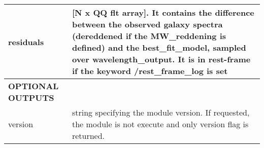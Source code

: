 \begin{center}
\begin{longtable}{p{2.7cm}| p{11.1cm}}
% 
 residuals &[N x QQ flt array]. It contains the difference between the observed galaxy spectra (dereddened if the MW\_reddening is defined) and the best\_fit\_model, 
                            sampled over wavelength\_output. It is in rest-frame if the keyword /rest\_frame\_log is set\\
%
\hline
{\bf  OPTIONAL OUTPUTS} &  \\
version & string specifying the module version. If requested, the module is not execute and only version flag is returned.\\
\hline
\hline
\end{longtable}
\end{center}
